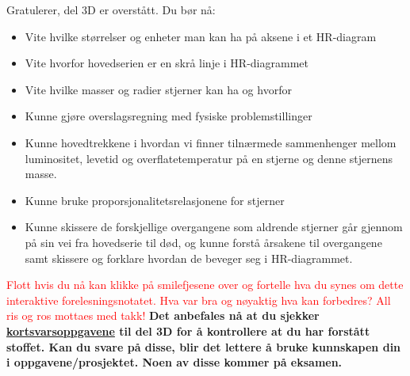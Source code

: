 \documentclass{beamer}
\let\hrefori\href
\renewcommand{\href}[2]{{\setlength{\fboxsep}{1pt}\colorbox{sunset}{\hrefori{#1}{#2}}}}
\newcommand{\pagebutton}[1]{\setbeamertemplate{button}{\tikz\node[inner xsep = 5pt, draw = structure!90, fill = green(ryb), rounded corners = 8pt]{\color{amber}\Large\insertbuttontext};}\beamerbutton{#1}}
\begin{document}
\begin{frame}
\label{oppsummering}
\hyperlink{se10}{\pagebutton{\small Forrige side}}\href{https://nettskjema.no/a/167471}{ \Changey[1][yellow]{-2}}
Gratulerer, del 3D er overstått. Du bør nå:
\begin{itemize}
\item  Vite hvilke størrelser og enheter man kan ha på aksene i et HR-diagram
\item  Vite hvorfor hovedserien er en skrå linje i HR-diagrammet
\item  Vite hvilke masser og radier stjerner kan ha og hvorfor
\item  Kunne gjøre overslagsregning med fysiske problemstillinger
\item  Kunne hovedtrekkene i hvordan vi finner tilnærmede sammenhenger mellom luminositet, levetid og overflatetemperatur på en stjerne og denne stjernens masse.
\item Kunne bruke proporsjonalitetsrelasjonene for stjerner
\item Kunne skissere de forskjellige overgangene som aldrende stjerner går gjennom på sin vei fra hovedserie til død, og kunne forstå årsakene til overgangene samt skissere og forklare hvordan de beveger seg i HR-diagrammet.
\end{itemize}
\textcolor{red}{Flott hvis du nå kan klikke på smilefjesene over og fortelle hva du synes om dette interaktive forelesningsnotatet. Hva var bra og nøyaktig hva kan forbedres? All ris og ros mottaes med takk!}
{\bf Det anbefales nå at du sjekker \href{https://www.uio.no/studier/emner/matnat/astro/AST2000/h21/undervisningsmateriell/kortsvarsoppgaver/del3d.pdf}{kortsvarsoppgavene} til del 3D for å kontrollere at du har forstått stoffet. Kan du svare på disse, blir det lettere å bruke kunnskapen din i oppgavene/prosjektet. Noen av disse kommer på eksamen.}
\end{frame}
\end{document}
